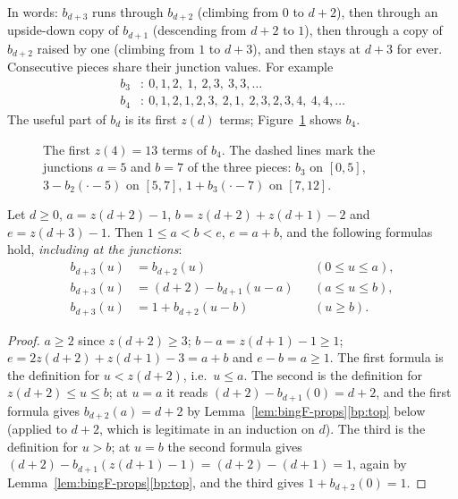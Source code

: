 
In words: $b_{d+3}$ runs through $b_{d+2}$ (climbing from $0$ to $d+2$), then through an
upside-down copy of $b_{d+1}$ (descending from $d+2$ to $1$), then through a copy of $b_{d+2}$
raised by one (climbing from $1$ to $d+3$), and then stays at $d+3$ for ever. Consecutive pieces
share their junction values. For example
\begin{align*}
b_3&:\ 0,1,2,\ 1,\ 2,3,\ 3,3,\dots\\
b_4&:\ 0,1,2,1,2,3,\ 2,1,\ 2,3,2,3,4,\ 4,4,\dots
\end{align*}
The useful part of $b_d$ is its first $z(d)$ terms; Figure~\ref{fig:b4} shows $b_4$.

\begin{figure}[ht]
\centering
{}
\caption{The first $z(4)=13$ terms of $b_4$. The dashed lines mark the junctions $a=5$ and
$b=7$ of the three pieces: $b_3$ on $[0,5]$, $3-b_2(\cdot-5)$ on $[5,7]$, $1+b_3(\cdot-7)$ on
$[7,12]$.}
\label{fig:b4}
\end{figure}

\begin{lemma}\label{lem:three-pieces}
Let $d\ge0$, $a=z(d+2)-1$, $b=z(d+2)+z(d+1)-2$ and $e=z(d+3)-1$. Then $1\le a<b<e$, $e=a+b$, and
the following formulas hold, \emph{including at the junctions}:
\begin{align*}
b_{d+3}(u)&=b_{d+2}(u) && (0\le u\le a),\\
b_{d+3}(u)&=(d+2)-b_{d+1}(u-a) && (a\le u\le b),\\
b_{d+3}(u)&=1+b_{d+2}(u-b) && (u\ge b).
\end{align*}
\end{lemma}

\begin{proof}
$a\ge2$ since $z(d+2)\ge3$; $b-a=z(d+1)-1\ge1$; $e=2z(d+2)+z(d+1)-3=a+b$ and $e-b=a\ge1$. The
first formula is the definition for $u<z(d+2)$, i.e.\ $u\le a$. The second is the definition for
$z(d+2)\le u\le b$; at $u=a$ it reads $(d+2)-b_{d+1}(0)=d+2$, and the first formula gives
$b_{d+2}(a)=d+2$ by Lemma~\ref{lem:bingF-props}\ref{bp:top} below (applied to $d+2$, which is
legitimate in an induction on $d$). The third is the definition for $u>b$; at $u=b$ the second
formula gives $(d+2)-b_{d+1}(z(d+1)-1)=(d+2)-(d+1)=1$, again by
Lemma~\ref{lem:bingF-props}\ref{bp:top}, and the third gives $1+b_{d+2}(0)=1$.
\end{proof}

